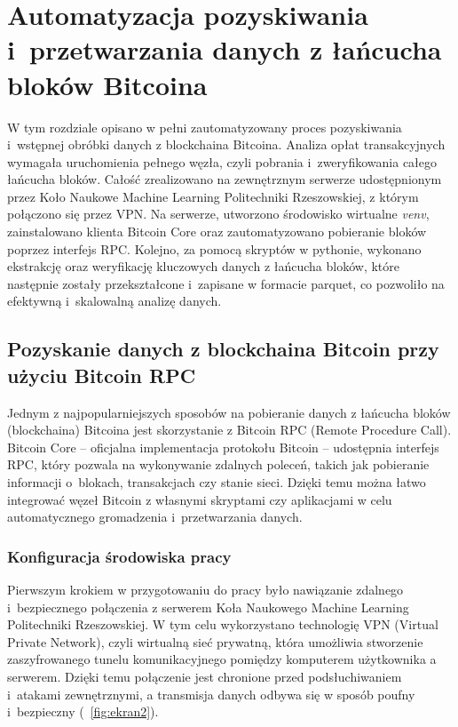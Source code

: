 \documentclass[12pt,a4paper]{report}
\theoremstyle{definition} %
\begin{document}
	\chapter{Automatyzacja pozyskiwania i~przetwarzania danych z łańcucha bloków Bitcoina}
	\hspace*{\parindent}W tym rozdziale opisano w pełni zautomatyzowany proces pozyskiwania i~wstępnej obróbki danych z blockchaina Bitcoina. Analiza opłat transakcyjnych wymagała uruchomienia pełnego węzła, czyli pobrania i~zweryfikowania całego łańcucha bloków. Całość zrealizowano na zewnętrznym serwerze udostępnionym przez Koło 				Naukowe Machine Learning Politechniki Rzeszowskiej, z którym połączono się przez VPN. Na serwerze, utworzono środowisko wirtualne \textit{venv}, zainstalowano klienta Bitcoin Core oraz zautomatyzowano pobieranie bloków poprzez interfejs RPC. Kolejno, za pomocą skryptów w pythonie, wykonano ekstrakcję oraz weryfikację kluczowych danych z łańcucha bloków, które następnie zostały przekształcone i~zapisane w formacie parquet, co pozwoliło na efektywną i~skalowalną analizę danych.
	\section{Pozyskanie danych z blockchaina Bitcoin przy użyciu Bitcoin RPC}
	\hspace*{\parindent} Jednym z najpopularniejszych sposobów na pobieranie danych z łańcucha bloków (blockchaina) Bitcoina jest skorzystanie z Bitcoin RPC (Remote Procedure Call). Bitcoin Core – oficjalna implementacja protokołu Bitcoin – udostępnia interfejs RPC, który pozwala na wykonywanie zdalnych poleceń, takich jak pobieranie informacji o~blokach, transakcjach czy stanie sieci. Dzięki temu można łatwo integrować węzeł Bitcoin z własnymi skryptami czy aplikacjami w celu automatycznego gromadzenia i~przetwarzania danych.

	\subsection{Konfiguracja środowiska pracy}
	\hspace*{\parindent}Pierwszym krokiem w przygotowaniu do pracy było nawiązanie zdalnego i~bezpiecznego połączenia z serwerem Koła Naukowego Machine Learning Politechniki Rzeszowskiej. W tym celu wykorzystano technologię VPN (Virtual Private Network), czyli wirtualną sieć prywatną, która umożliwia stworzenie zaszyfrowanego tunelu komunikacyjnego pomiędzy komputerem użytkownika a serwerem. Dzięki temu połączenie jest chronione przed podsłuchiwaniem i~atakami zewnętrznymi, a transmisja danych odbywa się w sposób poufny i~bezpieczny (\figurename~\ref{fig:ekran2}).
\end{document}
